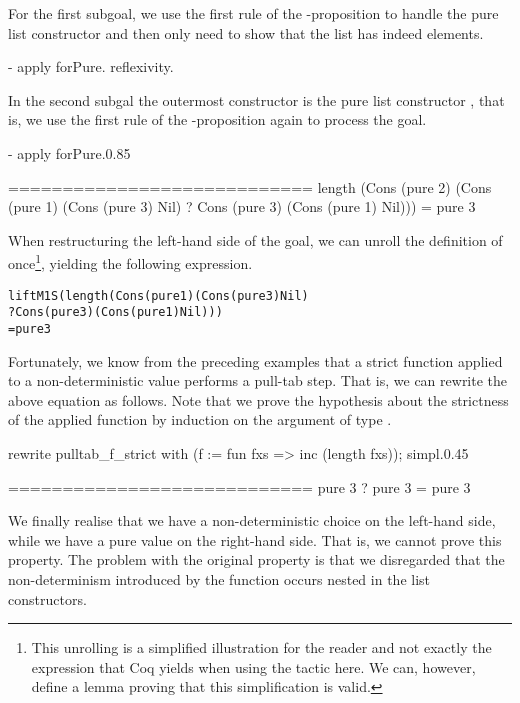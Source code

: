 For the first subgoal, we use the first rule of the \--proposition to handle the pure list constructor and then only need to show that the list has indeed  elements.

\begin{coqcode}
  - apply forPure. reflexivity.
\end{coqcode}

In the second subgal the outermost constructor is the pure list constructor , that is, we use the first rule of the \--proposition again to process the goal.

\begin{cproof2}{- apply forPure.}{0.85}

  ============================
  length (Cons (pure 2) (Cons (pure 1) (Cons (pure 3) Nil)
                        ? Cons (pure 3) (Cons (pure 1) Nil)))
  = pure 3
\end{cproof2}

When restructuring the left\--hand side of the goal, we can unroll the definition of  once\footnote{This unrolling is a simplified illustration for the reader and not exactly the expression that Coq yields when using the tactic  here. We can, however, define a lemma proving that this simplification is valid.}, yielding the following expression.

\begin{alltt}
  liftM1 S (length (Cons (pure 1) (Cons (pure 3) Nil)
                   ? Cons (pure 3) (Cons (pure 1) Nil)))
  = pure 3
\end{alltt}

Fortunately, we know from the preceding examples that a strict function applied to a non\--deterministic value performs a pull\--tab step.
That is, we can rewrite the above equation as follows.
Note that we prove the hypothesis about the strictness of the applied function  by induction on the argument of type .

\begin{cproof2}{rewrite pulltab_f_strict with (f := fun fxs => inc (length fxs)); simpl.}{0.45}

  ============================
  pure 3 ? pure 3 = pure 3
\end{cproof2}

We finally realise that we have a non\--deterministic choice on the left\--hand side, while we have a pure value on the right\--hand side.
That is, we cannot prove this property.
The problem with the original property is that we disregarded that the non\--determinism introduced by the function  occurs nested in the list constructors.

